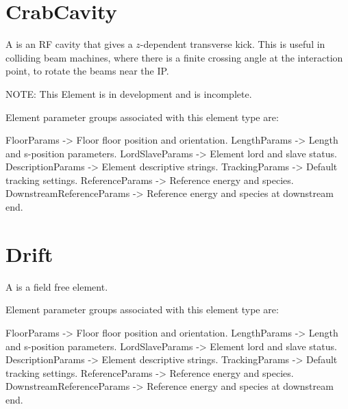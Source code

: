 \section{CrabCavity}
\label{s:crabcavity}

A  is an RF cavity that gives a $z$-dependent transverse kick. 
This is useful in colliding beam machines, where there is a finite crossing angle at the 
interaction point, to rotate the beams near the IP.

NOTE: This Element is in development and is incomplete.

Element parameter groups associated with this element type are:
\TOPrule
\begin{example}
  FloorParams -> Floor floor position and orientation.  
  LengthParams        -> Length and s-position parameters.  
  LordSlaveParams     -> Element lord and slave status.  
  DescriptionParams   -> Element descriptive strings.  
  TrackingParams      -> Default tracking settings.  
  ReferenceParams     -> Reference energy and species. 
  DownstreamReferenceParams -> Reference energy and species at downstream end. 
\end{example}
\BOTTOMrule


\section{Drift}
\label{s:drift}

A  is a field free element.

Element parameter groups associated with this element type are:
\TOPrule
\begin{example}
  FloorParams -> Floor floor position and orientation.  
  LengthParams        -> Length and s-position parameters.  
  LordSlaveParams     -> Element lord and slave status.  
  DescriptionParams   -> Element descriptive strings.  
  TrackingParams      -> Default tracking settings.  
  ReferenceParams     -> Reference energy and species. 
  DownstreamReferenceParams -> Reference energy and species at downstream end. 
\end{example}
\BOTTOMrule

